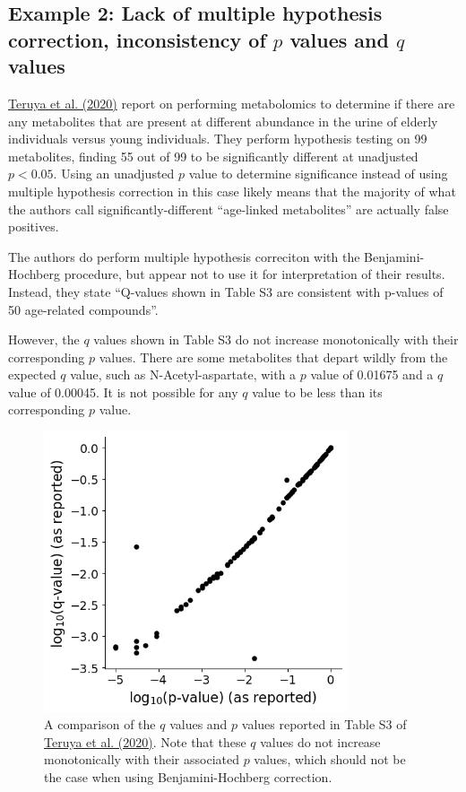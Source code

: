 \documentclass[letterpaper, 12pt]{article}
\begin{document}
\subsection*{Example 2: Lack of multiple hypothesis correction, inconsistency of $p$ values and $q$ values}

\href{https://doi.org/10.1096/fba.2020-00047}{Teruya et al. (2020)} report on performing metabolomics to determine if there are any metabolites that are present at different abundance in the urine of elderly individuals versus young individuals. They perform hypothesis testing on 99 metabolites, finding 55 out of 99 to be significantly different at unadjusted $p < 0.05$. Using an unadjusted $p$ value to determine significance instead of using multiple hypothesis correction in this case likely means that the majority of what the authors call significantly-different ``age-linked metabolites'' are actually false positives.

The authors do perform multiple hypothesis correciton with the Benjamini-Hochberg procedure, but appear not to use it for interpretation of their results. Instead, they state ``Q-values shown in Table S3 are consistent with p-values of 50 age-related compounds''.

However, the $q$ values shown in Table S3 do not increase monotonically with their corresponding $p$ values. There are some metabolites that depart wildly from the expected $q$ value, such as N-Acetyl-aspartate, with a $p$ value of 0.01675 and a $q$ value of 0.00045. It is not possible for any $q$ value to be less than its corresponding $p$ value.

\begin{figure}[h!tbp]
    \centering
    \includegraphics[width=0.8\textwidth]{img/multiple_hypothesis_correction/image-1715615096372.png}
    \caption*{A comparison of the $q$ values and $p$ values reported in Table S3 of \href{https://doi.org/10.1096/fba.2020-00047}{Teruya et al. (2020)}. Note that these $q$ values do not increase monotonically with their associated $p$ values, which should not be the case when using Benjamini-Hochberg correction.}
\end{figure}
\end{document}
